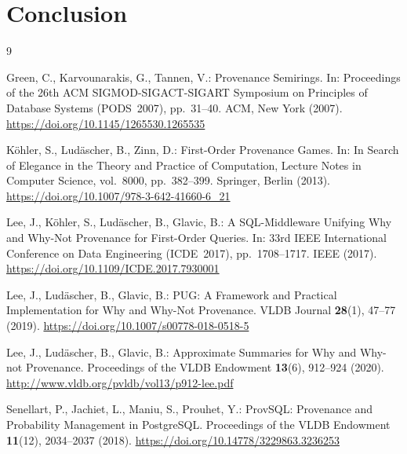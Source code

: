 \documentclass{llncs}
\begin{document}
\section{Conclusion}
\label{sec:conclusion}



\begin{thebibliography}{9}

Green, C., Karvounarakis, G., Tannen, V.:
Provenance Semirings.
In: Proceedings of the 26th ACM SIGMOD-SIGACT-SIGART Symposium on
Principles of Database Systems (PODS~2007), pp.~31--40.
ACM, New York (2007).
\url{https://doi.org/10.1145/1265530.1265535}

K\"{o}hler, S., Lud\"{a}scher, B., Zinn, D.:
First-Order Provenance Games.
In: In Search of Elegance in the Theory and Practice of Computation,
Lecture Notes in Computer Science, vol.~8000, pp.~382--399.
Springer, Berlin (2013).
\url{https://doi.org/10.1007/978-3-642-41660-6_21}

Lee, J., K\"{o}hler, S., Lud\"{a}scher, B., Glavic, B.:
A SQL-Middleware Unifying Why and Why-Not Provenance for First-Order
Queries.
In: 33rd IEEE International Conference on Data Engineering
(ICDE~2017), pp.~1708--1717. IEEE (2017).
\url{https://doi.org/10.1109/ICDE.2017.7930001}

Lee, J., Lud\"{a}scher, B., Glavic, B.:
PUG: A Framework and Practical Implementation for Why and Why-Not
Provenance.
VLDB Journal \textbf{28}(1), 47--77 (2019).
\url{https://doi.org/10.1007/s00778-018-0518-5}

Lee, J., Lud\"{a}scher, B., Glavic, B.:
Approximate Summaries for Why and Why-not Provenance.
Proceedings of the VLDB Endowment \textbf{13}(6), 912--924 (2020).
\url{http://www.vldb.org/pvldb/vol13/p912-lee.pdf}

Senellart, P., Jachiet, L., Maniu, S., Prouhet, Y.:
ProvSQL: Provenance and Probability Management in PostgreSQL.
Proceedings of the VLDB Endowment \textbf{11}(12), 2034--2037 (2018).
\url{https://doi.org/10.14778/3229863.3236253}

\end{thebibliography}
\end{document}
